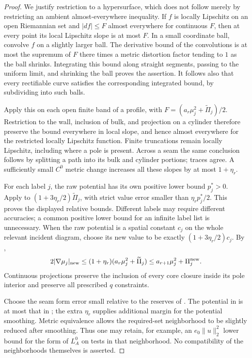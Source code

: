 \documentclass[11pt]{article}
\numberwithin{equation}{section}
\theoremstyle{definition}
\theoremstyle{remark}
\begin{document}
\begin{proof}
We justify restriction to a hypersurface, which does not follow merely
by restricting an ambient almost-everywhere inequality.  If $f$ is
locally Lipschitz on an open Riemannian set and $|df|\le F$ almost
everywhere for continuous $F$, then at every point its local Lipschitz
slope is at most $F$.  In a small coordinate ball, convolve $f$ on a
slightly larger ball.  The derivative bound of the convolutions is at
most the supremum of $F$ there times a metric distortion factor tending
to $1$ as the ball shrinks.  Integrating this bound along straight
segments, passing to the uniform limit, and shrinking the ball proves
the assertion.  It follows also that every rectifiable curve satisfies
the corresponding integrated bound, by subdividing into such balls.

Apply this on each open finite band of a profile, with
$F=(a_r\mu_j^2+\widetilde\Pi_j)/2$.  Restriction to the wall,
inclusion of bulk, and projection on a cylinder therefore preserve the
bound everywhere in local slope, and hence almost everywhere for the
restricted locally Lipschitz function.  Finite truncations remain
locally Lipschitz, including where a pole is present.  Across a seam
the same conclusion follows by splitting a path into its bulk and
cylinder portions; traces agree.  A sufficiently small $C^0$ metric
change increases all these slopes by at most $1+\eta_r$.

For each label $j$, the raw potential has its own positive lower
bound $p_j^*>0$.  Apply  to
$(1+3\eta_r/2)\widetilde\Pi_j$, with strict value error smaller than
$\eta_r p_j^*/2$.  This proves the displayed relative bounds.  Different
labels may require different accuracies; a common positive lower bound
for an infinite label list is unnecessary.  When the raw potential is
a spatial constant $c_j$ on the whole relevant incident diagram, choose
its new value to be exactly $(1+3\eta_r/2)c_j$.  By
,
\[
 2|\nabla\mu_j|_{\rm new}
 \le (1+\eta_r)(a_r\mu_j^2+\widetilde\Pi_j)
 \le a_{r+1}\mu_j^2+\Pi_j^{\rm new}.
\]
Continuous projections preserve the inclusion of every core closure
inside its pole interior and preserve all prescribed $q$ constraints.

Choose the seam form error small relative to the reserves of
.  The potential in  is at
most that in ; the extra $\eta_r$ supplies
additional margin for the potential smoothing.  Metric equivalence
allows the required-set neighborhood to be slightly reduced after
smoothing.  Thus one may retain, for example, an $e_0\|u\|_2^2$
lower bound for the form of $L_A^0$ on tests in that neighborhood.
No compatibility of the neighborhoods themselves is asserted.
\end{proof}
\end{document}
